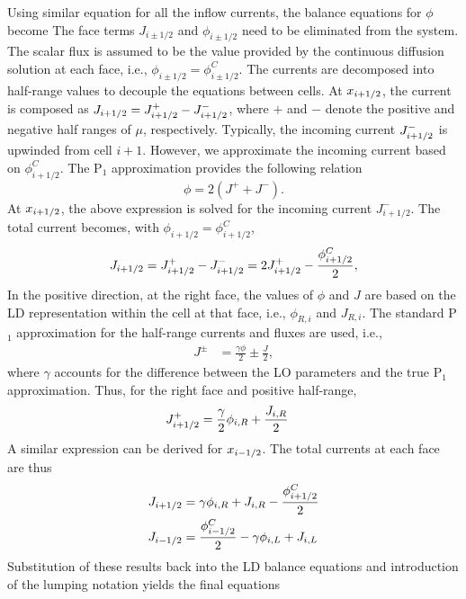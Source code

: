 Using similar equation for all the inflow currents, the balance equations for $\phi$
become
The face terms $J_{i\pm 1/2}$ and $\phi_{i\pm 1/2}$ need to be eliminated from the
system. The scalar flux is assumed to be the value provided by the continuous
diffusion solution at each face, i.e., $\phi_{i\pm1/2} = \phi_{i\pm1/2}^C$.
The currents are decomposed into half-range values to decouple the equations
between cells.  At $x_{{i+1/2}}$, the current is composed as $J_{i+1/2} = J_{{i+1/2}}^+ - J_{{i+1/2}}^-$,
where $+$ and $-$ denote the positive and negative
half ranges of $\mu$, respectively.  Typically, the incoming current $J_{{i+1/2}}^-$ is
upwinded from cell $i+1$. However, we approximate the incoming current based on $\phi_{i+1/2}^C$.  
The P$_1$ approximation provides the following relation
\begin{equation}
    \phi = 2(J^+ + J^-).
\end{equation}
At ${x_{i+1/2}}$, the above expression is solved for the incoming current $J_{i+1/2}^-$.  The
total current becomes, with $\phi_{i+1/2}=\phi_{i+1/2}^C$,
\begin{equation}\label{eq:jelim}
    J_{{i+1/2}} = J_{{i+1/2}}^+ - J_{{i+1/2}}^- = 2J_{{i+1/2}}^+ - \frac{\phi_{i+1/2}^C}{2},
\end{equation}
In the positive direction, at the right face, the
values of $\phi$ and $J$ are based on the LD representation within the cell at that
face, i.e., $\phi_{R,i}$ and $J_{R,i}$.  The standard P$_1$ approximation for the
half-range currents and fluxes are used\cite{stacy}, i.e.,
\begin{align}
    J^{\pm} &= \frac{\gamma \phi}{2} \pm \frac{J}{2},
\end{align}
where $\gamma$ accounts for the difference between the LO parameters and the true
P$_1$ approximation. Thus, for the right face and positive half-range,
\begin{align}
    J_{{i+1/2}}^+ &= \frac{\gamma}{2}\phi_{i,R} + \frac{J_{i,R}}{2} 
\end{align}
A similar expression can be derived for ${x_{i-1/2}}$.  The total currents at each face are
thus
\begin{align}
    J_{i+1/2} &= \gamma\phi_{i,R} + J_{i,R} - \frac{\phi_{{i+1/2}}^C}{2} \\
    J_{i-1/2} &= \frac{\phi_{i-1/2}^C}{2} - \gamma \phi_{i,L} + J_{i,L}
\end{align}
Substitution of these results back into the LD balance equations and introduction of the
lumping notation yields the final equations 
